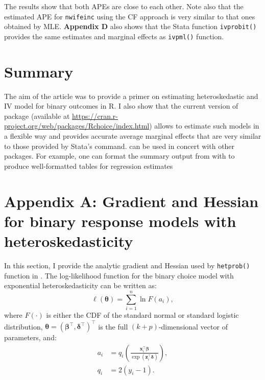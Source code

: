 The results show that both APEs are close to each other. Note also that the estimated APE for \texttt{nwifeinc} using the CF approach is very similar to that ones obtained by MLE. \textbf{Appendix D} also shows that the Stata function \texttt{ivprobit()} provides the same estimates and marginal effects as \texttt{ivpml()} function.

\hypertarget{summary}{%
\section{Summary}\label{summary}}

The aim of the article was to provide a primer on estimating heteroskedastic and IV model for binary outcomes in R. I also show that the current version of  package (available at \url{https://cran.r-project.org/web/packages/Rchoice/index.html}) allows to estimate such models in a flexible way and provides accurate average marginal effects that are very similar to those provided by Stata's  command.  can be used in concert with other packages. For example, one can format the summary output from  with  to produce well-formatted tables for regression estimates

\hypertarget{appendix-a-gradient-and-hessian-for-binary-response-models-with-heteroskedasticity}{%
\section{Appendix A: Gradient and Hessian for binary response models with heteroskedasticity}\label{appendix-a-gradient-and-hessian-for-binary-response-models-with-heteroskedasticity}}

In this section, I provide the analytic gradient and Hessian used by \texttt{hetprob()} function in . The log-likelihood function for the binary choice model with exponential heteroskedasticity can be written as:
\begin{equation*}
\ell(\boldsymbol \theta)= \sum_{i = 1}^n\ln F(a_i),
\end{equation*}
where \(F(\cdot)\) is either the CDF of the standard normal or standard logistic distribution, \(\boldsymbol \theta= \left(\boldsymbol \beta^\top, \boldsymbol \delta^\top\right)^\top\) is the full \((k+p)\)-dimensional vector of parameters, and:
\begin{equation*}
\begin{aligned}
a_i & = q_i\left(\frac{\mathbf x_i^\top\boldsymbol \beta}{\exp(\mathbf z_i^\top\boldsymbol \delta)}\right), \\
q_i & = 2(y_{i}-1).
\end{aligned}
\end{equation*}

